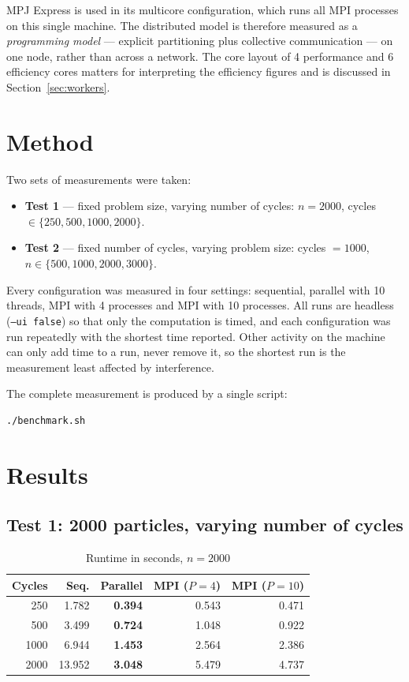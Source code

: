 \documentclass[sigconf]{acmart}
\begin{document}
MPJ Express is used in its multicore configuration, which runs all MPI processes on this single
machine. The distributed model is therefore measured as a \emph{programming model} --- explicit
partitioning plus collective communication --- on one node, rather than across a network. The core
layout of 4 performance and 6 efficiency cores matters for interpreting the efficiency figures and is
discussed in Section~\ref{sec:workers}.

\section{Method}

Two sets of measurements were taken:

\begin{itemize}
    \item \textbf{Test 1} --- fixed problem size, varying number of cycles:
          $n = 2000$, cycles $\in \{250, 500, 1000, 2000\}$.
    \item \textbf{Test 2} --- fixed number of cycles, varying problem size:
          cycles $= 1000$, $n \in \{500, 1000, 2000, 3000\}$.
\end{itemize}

Every configuration was measured in four settings: sequential, parallel with 10 threads, MPI with 4
processes and MPI with 10 processes. All runs are headless (\texttt{--ui false}) so that only the
computation is timed, and each configuration was run repeatedly with the shortest time reported.
Other activity on the machine can only add time to a run, never remove it, so the shortest run is the
measurement least affected by interference.

The complete measurement is produced by a single script:

\begin{lstlisting}[language=bash]
./benchmark.sh
\end{lstlisting}

\section{Results}

\subsection{Test 1: 2000 particles, varying number of cycles}

\begin{table}[h]
\centering
\caption{Runtime in seconds, $n = 2000$}
\begin{tabular}{@{}rrrrr@{}}
\toprule
Cycles & Seq. & Parallel & MPI ($P{=}4$) & MPI ($P{=}10$) \\
\midrule
250  & 1.782  & \textbf{0.394} & 0.543 & 0.471 \\
500  & 3.499  & \textbf{0.724} & 1.048 & 0.922 \\
1000 & 6.944  & \textbf{1.453} & 2.564 & 2.386 \\
2000 & 13.952 & \textbf{3.048} & 5.479 & 4.737 \\
\bottomrule
\end{tabular}
\end{table}
\end{document}
